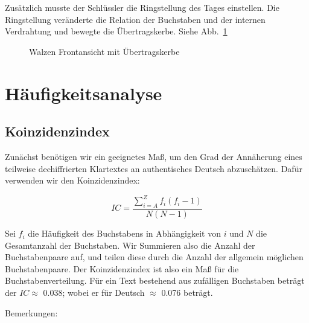 \documentclass[ngerman, a4paper, footsepline, headsepline, numbers=noenddot]{scrreport}
\begin{document}
	Zusätzlich musste der Schlüssler die Ringstellung des Tages einstellen. Die Ringstellung veränderte die Relation der Buchstaben und der internen Verdrahtung und bewegte die Übertragskerbe. Siehe Abb.~\ref{fig:enigma-rotor-contact}
	
	\begin{figure}[htbp]
		\centering
		\caption{Walzen Frontansicht mit Übertragskerbe}
		\label{fig:enigma-rotor-contact}
	\end{figure}
	
	
	\chapter{Häufigkeitsanalyse}
	\section{Koinzidenzindex}
	\thispagestyle{scrheadings}
	
	Zunächst benötigen wir ein geeignetes Maß, um den Grad der Annäherung eines teilweise dechiffrierten Klartextes an authentisches Deutsch abzuschätzen. Dafür verwenden wir den Koinzidenzindex:
	
	$$
	IC = \frac{\sum_{i=A}^{Z}f_i(f_i-1)}{N(N-1)}
	$$
	
	Sei $f_i$ die Häufigkeit des Buchstabens in Abhängigkeit von $i$ und $N$ die Gesamtanzahl der Buchstaben. Wir Summieren also die Anzahl der Buchstabenpaare auf, und teilen diese durch die Anzahl der allgemein möglichen Buchstabenpaare. Der Koinzidenzindex ist also ein Maß für die Buchstabenverteilung. Für ein Text bestehend aus zufälligen Buchstaben beträgt der $IC \approx$ 0.038; wobei er für Deutsch $\approx$ 0.076 beträgt.
	\newpage
	
	Bemerkungen:
	
\end{document}

